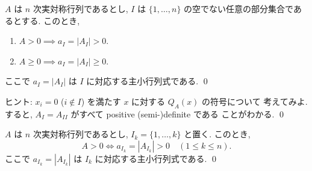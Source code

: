 \documentclass[12pt,twoside]{jarticle}
\begin{document}
\begin{question}
\label{q:criterion-positive-0}
  $A$ は $n$ 次実対称行列であるとし, 
  $I$ は $\{1,\dots,n\}$ の空でない任意の部分集合であるとする.
  このとき, 
  \begin{enumerate}
  \item $A > 0   \implies a_I = |A_I| > 0$.
  \item $A \ge 0 \implies a_I = |A_I| \ge 0$.
  \end{enumerate}
  ここで $a_I=|A_I|$ は $I$ に対応する主小行列式である. \qed
\end{question}

\noindent
ヒント: $x_i=0$ ($i\notin I$) を満たす $x$ に対する $Q_A(x)$ の符号について
考えてみよ.  すると, $A_I=A_{II}$ がすべて positive (semi-)definite である
ことがわかる. 
\qed


\begin{question}
\label{q:criterion-positive-1}
  $A$ は $n$ 次実対称行列であるとし, $I_k=\{1,\dots,k\}$ と置く.
  このとき, 
  \begin{equation*}
    A > 0 \iff a_{I_k} = |A_{I_k}| > 0 \quad(1\le k\le n).
  \end{equation*}
  ここで $a_{I_k}=|A_{I_k}|$ は $I_k$ に対応する主小行列式である. \qed
\end{question}
\end{document}

